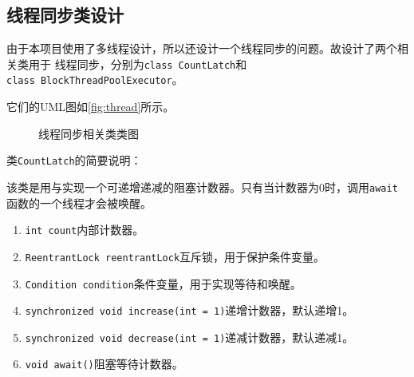 \documentclass[UTF8,a4paper,12pt]{ctexart}
\begin{document}
\subsection{线程同步类设计}
由于本项目使用了多线程设计，所以还设计一个线程同步的问题。故设计了两个相关类用于
线程同步，分别为\texttt{class CountLatch}和\\
\texttt{class BlockThreadPoolExecutor}。\par
它们的UML图如\autoref{fig:thread}所示。
\begin{figure}[htbp]
\centering
{}
\caption{线程同步相关类类图}
\label{fig:thread}
\end{figure}
类\texttt{CountLatch}的简要说明：\par
该类是用与实现一个可递增递减的阻塞计数器。只有当计数器为0时，调用\texttt{await}函数的一个线程才会被唤醒。\par
\begin{enumerate}[label=(\arabic*), wide=2em]
\item \texttt{int count}内部计数器。
\item \texttt{ReentrantLock reentrantLock}互斥锁，用于保护条件变量。
\item \texttt{Condition condition}条件变量，用于实现等待和唤醒。
\item \texttt{synchronized void increase(int = 1)}递增计数器，默认递增1。
\item \texttt{synchronized void decrease(int = 1)}递减计数器，默认递减1。
\item \texttt{void await()}阻塞等待计数器。
\end{enumerate}
\end{document}
